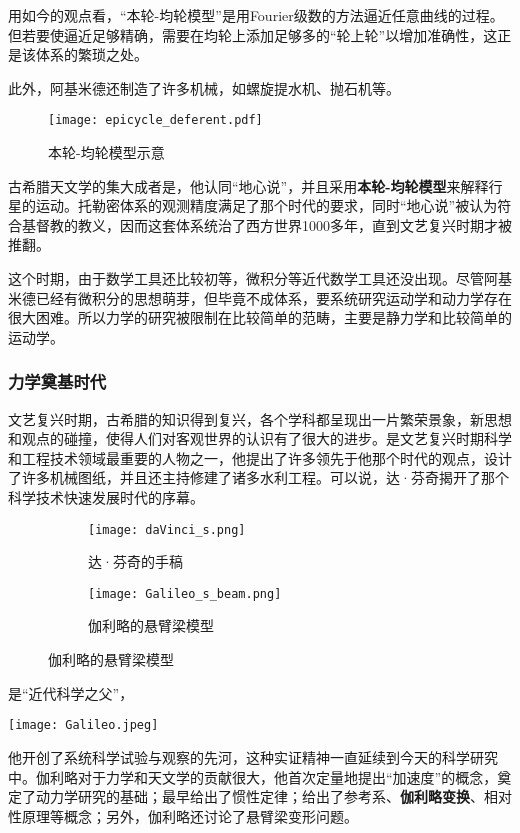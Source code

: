 \begin{marginpartext}
        用如今的观点看，“本轮-均轮模型”是用Fourier级数的方法逼近任意曲线的过程。但若要使逼近足够精确，需要在均轮上添加足够多的“轮上轮”以增加准确性，这正是该体系的繁琐之处。
\end{marginpartext}

此外，阿基米德还制造了许多机械，如螺旋提水机、抛石机等。

\begin{figure}
    \centering
    \texttt{[image: epicycle\_deferent.pdf]}
    \caption{本轮-均轮模型示意}
\end{figure}

古希腊天文学的集大成者是，他认同“地心说”，并且采用\textbf{本轮-均轮模型}来解释行星的运动。托勒密体系的观测精度满足了那个时代的要求，同时“地心说”被认为符合基督教的教义，因而这套体系统治了西方世界1000多年，直到文艺复兴时期才被推翻。

这个时期，由于数学工具还比较初等，微积分等近代数学工具还没出现。尽管阿基米德已经有微积分的思想萌芽，但毕竟不成体系，要系统研究运动学和动力学存在很大困难。所以力学的研究被限制在比较简单的范畴，主要是静力学和比较简单的运动学。

\subsubsection{力学奠基时代}

文艺复兴时期，古希腊的知识得到复兴，各个学科都呈现出一片繁荣景象，新思想和观点的碰撞，使得人们对客观世界的认识有了很大的进步。是文艺复兴时期科学和工程技术领域最重要的人物之一，他提出了许多领先于他那个时代的观点，设计了许多机械图纸，并且还主持修建了诸多水利工程。可以说，达·芬奇揭开了那个科学技术快速发展时代的序幕。

\begin{figure}[ht]
    \centering
    \begin{subfigure}[t]{0.4\textwidth} \centering
        \texttt{[image: daVinci\_s.png]}
        \caption{达·芬奇的手稿}
    \end{subfigure}\quad
    \begin{subfigure}[t]{0.4\textwidth} \centering
        \texttt{[image: Galileo\_s\_beam.png]}
        \caption{伽利略的悬臂梁模型}
    \end{subfigure}\bigskip
\end{figure}



是“近代科学之父”，
\begin{marginparfigure}
    \centering
    \texttt{[image: Galileo.jpeg]}
\end{marginparfigure}
他开创了系统科学试验与观察的先河，这种实证精神一直延续到今天的科学研究中。伽利略对于力学和天文学的贡献很大，他首次定量地提出“加速度”的概念，奠定了动力学研究的基础；最早给出了惯性定律；给出了参考系、\textbf{伽利略变换}、相对性原理等概念；另外，伽利略还讨论了悬臂梁变形问题。

